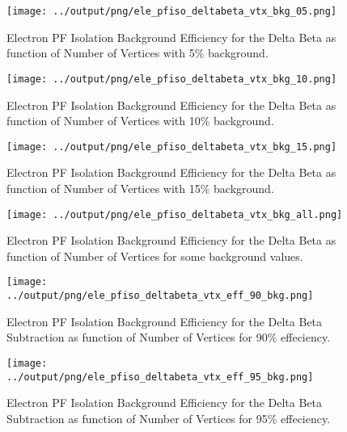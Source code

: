 \documentclass[11pt]{book}
\begin{document}
\begin{figure}[htb]
\centering
\texttt{[image: ../output/png/ele\_pfiso\_deltabeta\_vtx\_bkg\_05.png]}
\caption{Electron PF Isolation Background Efficiency for the Delta Beta as function of Number of Vertices with 5\% background.}
\label{fig:ele_pfiso_vtx_bkg_deltabeta_bkg_05}
\end{figure}

\begin{figure}[htb]
\centering
\texttt{[image: ../output/png/ele\_pfiso\_deltabeta\_vtx\_bkg\_10.png]}
\caption{Electron PF Isolation Background Efficiency for the Delta Beta as function of Number of Vertices with 10\% background.}
\label{fig:ele_pfiso_vtx_bkg_deltabeta_bkg_10}
\end{figure}

\begin{figure}[htb]
\centering
\texttt{[image: ../output/png/ele\_pfiso\_deltabeta\_vtx\_bkg\_15.png]}
\caption{Electron PF Isolation Background Efficiency for the Delta Beta as function of Number of Vertices with 15\% background.}
\label{fig:ele_pfiso_vtx_bkg_deltabeta_bkg_15}
\end{figure}

\begin{figure}[htb]
\centering
\texttt{[image: ../output/png/ele\_pfiso\_deltabeta\_vtx\_bkg\_all.png]}
\caption{Electron PF Isolation Background Efficiency for the Delta Beta as function of Number of Vertices for some background values.}
\label{fig:ele_pfiso_vtx_bkg_deltabeta_bkg_all}
\end{figure}

\begin{figure}[htb]
\centering
\texttt{[image: ../output/png/ele\_pfiso\_deltabeta\_vtx\_eff\_90\_bkg.png]}
\caption{Electron PF Isolation Background Efficiency for the Delta Beta Subtraction as function of Number of Vertices for 90\% effeciency.}
\label{fig:ele_pfiso_vtx_eff_deltabeta_eff_90_bkg}
\end{figure}

\begin{figure}[htb]
\centering
\texttt{[image: ../output/png/ele\_pfiso\_deltabeta\_vtx\_eff\_95\_bkg.png]}
\caption{Electron PF Isolation Background Efficiency for the Delta Beta Subtraction as function of Number of Vertices for 95\% effeciency.}
\label{fig:ele_pfiso_vtx_eff_deltabeta_eff_95_bkg}
\end{figure}
\end{document}

